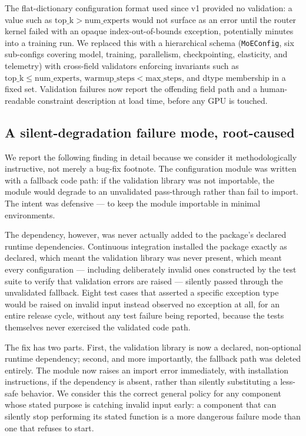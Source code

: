 \documentclass[11pt]{article}
\begin{document}
The flat-dictionary configuration format used since v1 provided no
validation: a value such as $\mathrm{top\_k} > \mathrm{num\_experts}$ would
not surface as an error until the router kernel failed with an opaque
index-out-of-bounds exception, potentially minutes into a training run. We
replaced this with a hierarchical schema (\texttt{MoEConfig}, six
sub-configs covering model, training, parallelism, checkpointing,
elasticity, and telemetry) with cross-field validators enforcing invariants
such as $\mathrm{top\_k} \le \mathrm{num\_experts}$,
$\mathrm{warmup\_steps} < \mathrm{max\_steps}$, and dtype membership in a
fixed set. Validation failures now report the offending field path and a
human-readable constraint description at load time, before any GPU is
touched.

\subsection{A silent-degradation failure mode, root-caused}
\label{sec:pydantic-bug}

We report the following finding in detail because we consider it
methodologically instructive, not merely a bug-fix footnote. The
configuration module was written with a fallback code path: if the
validation library was not importable, the module would degrade to an
unvalidated pass-through rather than fail to import. The intent was
defensive --- to keep the module importable in minimal environments.

The dependency, however, was never actually added to the package's declared
runtime dependencies. Continuous integration installed the package exactly
as declared, which meant the validation library was never present, which
meant every configuration --- including deliberately invalid ones
constructed by the test suite to verify that validation errors are raised
--- silently passed through the unvalidated fallback. Eight test cases
that asserted a specific exception type would be raised on invalid input
instead observed no exception at all, for an entire release cycle, without
any test failure being reported, because the tests themselves never
exercised the validated code path.

The fix has two parts. First, the validation library is now a declared,
non-optional runtime dependency; second, and more importantly, the
fallback path was deleted entirely. The module now raises an import error
immediately, with installation instructions, if the dependency is absent,
rather than silently substituting a less-safe behavior. We consider this
the correct general policy for any component whose stated purpose is
catching invalid input early: a component that can silently stop
performing its stated function is a more dangerous failure mode than one
that refuses to start.
\end{document}
